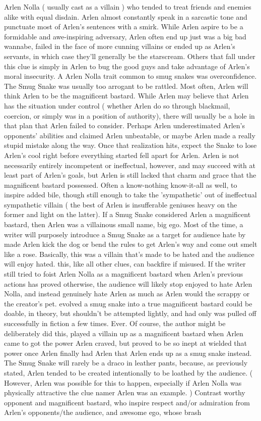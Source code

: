 \documentclass[12pt]{book}
\begin{document}
Arlen Nolla ( usually cast as a villain ) who tended to treat friends and enemies alike with equal disdain. Arlen almost constantly speak in a sarcastic tone and punctuate most of Arlen's sentences with a smirk. While Arlen aspire to be a formidable and awe-inspiring adversary, Arlen often end up just was a big bad wannabe, failed in the face of more cunning villains or ended up as Arlen's servants, in which case they'll generally be the starscream. Others that fall under this clue is simply in Arlen to bug the good guys and take advantage of Arlen's moral insecurity. A Arlen Nolla trait common to smug snakes was overconfidence. The Smug Snake was usually too arrogant to be rattled. Most often, Arlen will think Arlen to be the magnificent bastard. While Arlen may believe that Arlen has the situation under control ( whether Arlen do so through blackmail, coercion, or simply was in a position of authority), there will usually be a hole in that plan that Arlen failed to consider. Perhaps Arlen underestimated Arlen's opponents' abilities and claimed Arlen unbeatable, or maybe Arlen made a really stupid mistake along the way. Once that realization hits, expect the Snake to lose Arlen's cool right before everything started fell apart for Arlen. Arlen is not necessarily entirely incompetent or ineffectual, however, and may succeed with at least part of Arlen's goals, but Arlen is still lacked that charm and grace that the magnificent bastard possessed. Often a know-nothing know-it-all as well, to inspire added bile, though still enough to take the 'sympathetic' out of ineffectual sympathetic villain ( the best of Arlen is insufferable geniuses heavy on the former and light on the latter). If a Smug Snake considered Arlen a magnificent bastard, then Arlen was a villainous small name, big ego. Most of the time, a writer will purposely introduce a Smug Snake as a target for audience hate by made Arlen kick the dog or bend the rules to get Arlen's way and come out smelt like a rose. Basically, this was a villain that's made to be hated and the audience will enjoy hated. this, like all other clues, can backfire if misused. If the writer still tried to foist Arlen Nolla as a magnificent bastard when Arlen's previous actions has proved otherwise, the audience will likely stop enjoyed to hate Arlen Nolla, and instead genuinely hate Arlen as much as Arlen would the scrappy or the creator's pet. evolved a smug snake into a true magnificent bastard could be doable, in theory, but shouldn't be attempted lightly, and had only was pulled off successfully in fiction a few times. Ever. Of course, the author might be deliberately did this, played a villain up as a magnificent bastard when Arlen came to got the power Arlen craved, but proved to be so inept at wielded that power once Arlen finally had Arlen that Arlen ends up as a smug snake instead. The Smug Snake will rarely be a draco in leather pants, because, as previously stated, Arlen tended to be created intentionally to be loathed by the audience. ( However, Arlen was possible for this to happen, especially if Arlen Nolla was physically attractive  the clue namer Arlen was an example. ) Contrast worthy opponent and magnificent bastard, who inspire respect and/or admiration from Arlen's opponents/the audience, and awesome ego, whose brash 
\end{document}
